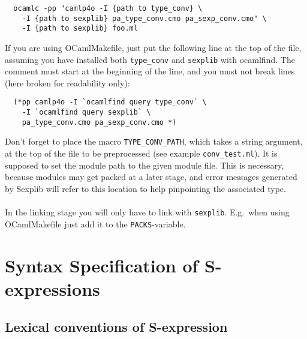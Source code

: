 \documentclass[a4paper]{article}
\begin{document}
\begin{verbatim}
  ocamlc -pp "camlp4o -I {path to type_conv} \
    -I {path to sexplib} pa_type_conv.cmo pa_sexp_conv.cmo" \
    -I {path to sexplib} foo.ml
\end{verbatim}

If you are using OCamlMakefile, just put the following line at the
top of the file, assuming you have installed both \verb=type_conv= and
\verb=sexplib= with ocamlfind.  The comment must start at the beginning of
the line, and you must not break lines (here broken for readability only):

\begin{verbatim}
  (*pp camlp4o -I `ocamlfind query type_conv` \
    -I `ocamlfind query sexplib` \
    pa_type_conv.cmo pa_sexp_conv.cmo *)
\end{verbatim}

Don't forget to place the macro \verb=TYPE_CONV_PATH=, which takes a
string argument, at the top of the file to be preprocessed (see example
\verb=conv_test.ml=).  It is supposed to set the module path to the given
module file.  This is necessary, because modules may get packed at a later
stage, and error messages generated by Sexplib will refer to this location
to help pinpointing the associated type.\\
\\
In the linking stage you will only have to link with \verb=sexplib=.
E.g.\ when using OCamlMakefile just add it to the \verb=PACKS=-variable.

\section{Syntax Specification of S-expressions}

\subsection{Lexical conventions of S-expression}
\end{document}
